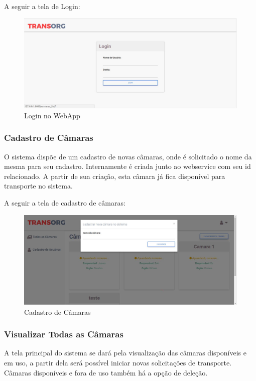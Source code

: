 	A seguir a tela de Login:

\begin{figure}[H]
\centering
\includegraphics[width=16cm]{figuras/login_software.JPG}
\caption{Login no WebApp}
\end{figure}

\subsubsection{Cadastro de Câmaras}
	O sistema dispõe de um cadastro de novas câmaras, onde é solicitado o nome da mesma para seu cadastro. Internamente é criada junto ao webservice com seu id relacionado. A partir de sua criação, esta câmara já fica disponível para transporte no sistema.
	
	A seguir a tela de cadastro de câmaras:

\begin{figure}[H]
\centering
\includegraphics[width=16cm]{figuras/cadastroCamaras_software.JPG}
\caption{Cadastro de Câmaras}
\end{figure}

\subsubsection{Visualizar Todas as Câmaras}
	A tela principal do sistema se dará pela visualização das câmaras disponíveis e em uso, a partir dela será possível iniciar novas solicitações de transporte. Câmaras disponíveis e fora de uso também há a opção de deleção.
	
